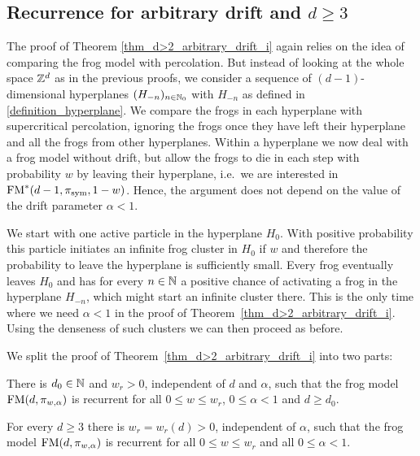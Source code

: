 
\subsection*{Recurrence for arbitrary drift and $d \geq 3$}

The proof of Theorem \ref{thm_d>2_arbitrary_drift_i} again relies on the idea of comparing the frog model with percolation. But instead of looking at the whole space $\mathbb{Z}^d$ as in the previous proofs, we consider a sequence of $(d-1)$-dimensional hyperplanes $(H_{-n})_{n \in \mathbb{N}_0}$ with $H_{-n}$ as defined in \eqref{definition_hyperplane}. We compare the frogs in each hyperplane with supercritical percolation, ignoring the frogs once they have left their hyperplane and all the frogs from other hyperplanes. Within a hyperplane we now deal with a frog model without drift, but allow the frogs to die in each step with probability $w$ by leaving their hyperplane, i.e.~we are interested in $\operatorname{FM}^*(d-1,\pi_{\text{sym}},1-w)$. Hence, the argument does not depend on the value of the drift parameter $\alpha<1$. 

We start with one active particle in the hyperplane $H_0$. With positive probability this particle initiates an infinite frog cluster in $H_0 $ if $w$ and therefore the probability to leave the hyperplane is sufficiently small. Every frog eventually leaves $H_0$ and has for every $n \in \mathbb{N}$ a positive chance of activating a frog in the hyperplane $H_{-n}$, which might start an infinite cluster there. This is the only time where we need $\alpha <1$ in the proof of Theorem~\ref{thm_d>2_arbitrary_drift_i}. Using the denseness of such clusters we can then proceed as before.

We split the proof of Theorem~\ref{thm_d>2_arbitrary_drift_i} into two parts:

\begin{prop}\label{prop_d>2_arbitrary_drift_large_d}
 There is $d_0 \in \mathbb{N}$ and $w_r > 0$, independent of $d$ and $\alpha$, such that the frog model $\operatorname{FM}(d,\pi_{w,\alpha})$ is recurrent for all $0 \leq w \leq w_r$, $0 \leq \alpha < 1$ and $d \geq d_0$.
\end{prop}

\begin{prop}\label{prop_d>2_arbitrary_drift_small_d}
 For every $d\geq 3$ there is $w_r = w_r(d) > 0$, independent of $\alpha$, such that the frog model $\operatorname{FM}(d,\pi_{w,\alpha})$ is recurrent for all $0 \leq w \leq w_r$ and all $0 \leq \alpha < 1$.
\end{prop}

